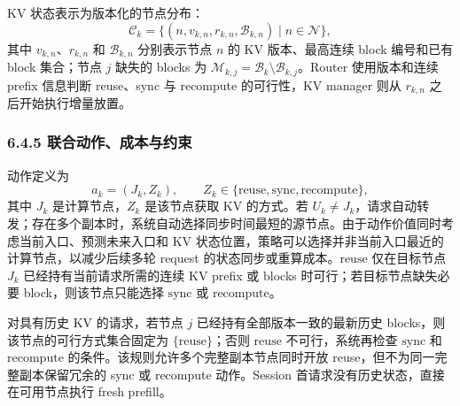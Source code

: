 KV 状态表示为版本化的节点分布：
\[
\mathcal C_k
=
\{(n,v_{k,n},r_{k,n},\mathcal B_{k,n})\mid n\in\mathcal N\},
\]
其中 \(v_{k,n}\)、\(r_{k,n}\) 和 \(\mathcal B_{k,n}\) 分别表示节点 \(n\) 的 KV 版本、最高连续 block 编号和已有 block 集合；节点 \(j\) 缺失的 blocks 为 \(\mathcal M_{k,j}=\mathcal B_k\setminus\mathcal B_{k,j}\)。Router 使用版本和连续 prefix 信息判断 reuse、sync 与 recompute 的可行性，KV manager 则从 \(r_{k,n}\) 之后开始执行增量放置。

\subsubsection*{6.4.5 联合动作、成本与约束}

动作定义为
\[
a_k=(J_k,Z_k),\qquad
Z_k\in\{\mathrm{reuse},\mathrm{sync},\mathrm{recompute}\},
\]
其中 \(J_k\) 是计算节点，\(Z_k\) 是该节点获取 KV 的方式。若 \(U_k\ne J_k\)，请求自动转发；存在多个副本时，系统自动选择同步时间最短的源节点。由于动作价值同时考虑当前入口、预测未来入口和 KV 状态位置，策略可以选择并非当前入口最近的计算节点，以减少后续多轮 request 的状态同步或重算成本。\(\mathrm{reuse}\) 仅在目标节点 \(J_k\) 已经持有当前请求所需的连续 KV prefix 或 blocks 时可行；若目标节点缺失必要 block，则该节点只能选择 \(\mathrm{sync}\) 或 \(\mathrm{recompute}\)。

对具有历史 KV 的请求，若节点 \(j\) 已经持有全部版本一致的最新历史 blocks，则该节点的可行方式集合固定为 \(\{\mathrm{reuse}\}\)；否则 \(\mathrm{reuse}\) 不可行，系统再检查 \(\mathrm{sync}\) 和 \(\mathrm{recompute}\) 的条件。该规则允许多个完整副本节点同时开放 reuse，但不为同一完整副本保留冗余的 sync 或 recompute 动作。Session 首请求没有历史状态，直接在可用节点执行 fresh prefill。

